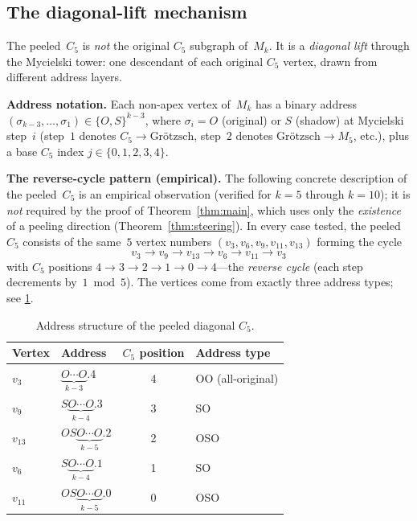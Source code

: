 \documentclass[11pt,a4paper]{amsart}
\theoremstyle{plain}
\theoremstyle{definition}
\theoremstyle{remark}
\begin{document}
\subsection{The diagonal-lift mechanism}\label{ssec:diagonal}

The peeled~$C_5$ is \emph{not} the original $C_5$ subgraph of~$M_k$.  It is a
\emph{diagonal lift} through the Mycielski tower: one descendant of each
original $C_5$ vertex, drawn from different address layers.

\medskip\noindent
\textbf{Address notation.}
Each non-apex vertex of~$M_k$ has a binary address
$(\sigma_{k-3},\ldots,\sigma_1) \in \{O,S\}^{k-3}$, where $\sigma_i = O$
(original) or $S$ (shadow) at Mycielski step~$i$ (step~$1$ denotes
$C_5 \to\text{Gr\"otzsch}$, step~$2$ denotes
$\text{Gr\"otzsch}\to M_5$, etc.), plus a base $C_5$ index
$j \in \{0,1,2,3,4\}$.

\medskip\noindent
\textbf{The reverse-cycle pattern (empirical).}
The following concrete description of the peeled~$C_5$ is an empirical
observation (verified for $k = 5$ through $k = 10$); it is \emph{not} required
by the proof of Theorem~\ref{thm:main}, which uses only the \emph{existence} of a
peeling direction (Theorem~\ref{thm:steering}).  In every case tested, the peeled~$C_5$
consists of the same~$5$ vertex numbers $(v_3, v_6, v_9, v_{11}, v_{13})$
forming the cycle
\[
  v_3 \to v_9 \to v_{13} \to v_6 \to v_{11} \to v_3
\]
with $C_5$ positions $4 \to 3 \to 2 \to 1 \to 0 \to 4$---the \emph{reverse
cycle} (each step decrements by~$1\bmod 5$).  The vertices come from exactly
three address types; see \cref{tab:address}.

\begin{table}[ht]
\centering
\caption{Address structure of the peeled diagonal $C_5$.}
\label{tab:address}
\begin{tabular}{llcl}
\toprule
Vertex & Address & $C_5$ position & Address type \\
\midrule
$v_3$  & $\underbrace{O\cdots O}_{k-3}.4$ & 4 & OO (all-original) \\
$v_9$  & $S\underbrace{O\cdots O}_{k-4}.3$ & 3 & SO \\
$v_{13}$ & $OS\underbrace{O\cdots O}_{k-5}.2$ & 2 & OSO \\
$v_6$  & $S\underbrace{O\cdots O}_{k-4}.1$ & 1 & SO \\
$v_{11}$ & $OS\underbrace{O\cdots O}_{k-5}.0$ & 0 & OSO \\
\bottomrule
\end{tabular}
\end{table}
\end{document}
